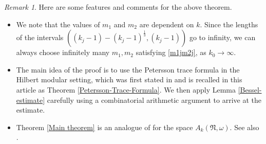 \documentclass[reqno]{amsart}
\theoremstyle{plain}
\theoremstyle{definition}
\theoremstyle{remark}
\newtheorem{remark}{Remark}
\begin{document}
\begin{remark}
Here are some features and comments for the above theorem. 
\begin{itemize}
\item We note that the values of  $m_1$ and $m_2$ are dependent on $k$.  Since the lengths of the intervals $ \left((k_{j}  -1)-(k_{j}  -1)^{\frac{1}{3}},(k_{j}  -1)\right)$ 
go to infinity, we can always choose infinitely many $m_1,m_2$ satisfying \eqref{m1jm2j}, as $k_0 \to \infty$.
\item The main idea of the proof is to use the Petersson trace formula in the Hilbert modular setting, which was first stated in \cite{KL} and is recalled in this article as Theorem \ref{Petersson-Trace-Formula}.  We then apply Lemma \ref{Bessel-estimate} carefully using a combinatorial arithmetic argument to arrive at the estimate. 
\item  Theorem \ref{Main theorem} is an analogue of \cite[Theorem 1.7]{JS} for the space $A_{k}(\mathfrak{N},\omega)$.  See also \cite[Theorem 4(i)]{JD}. 
\end{itemize}
\end{remark}
\end{document}
